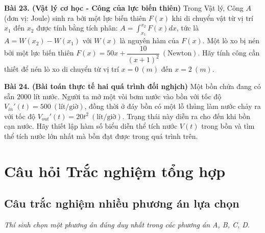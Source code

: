 \documentclass[12pt]{article}
\begin{document}
\begin{btdo}[]
		\textbf{Bài 23. (Vật lý cơ học - Công của lực biến thiên)} Trong Vật lý, Công $A$ (đơn vị: Joule) sinh ra bởi một lực biến thiên $F(x)$ khi di chuyển vật từ vị trí $x_1$ đến $x_2$ được tính bằng tích phân: $A = \int_{x_1}^{x_2} F(x)dx$, tức là $A = W(x_2) - W(x_1)$ với $W(x)$ là nguyên hàm của $F(x)$. Một lò xo bị nén bởi một lực biến thiên $F(x) = 50x + \dfrac{10}{(x+1)^2} \ (\text{Newton})$. Hãy tính công cần thiết để nén lò xo di chuyển từ vị trí $x = 0 \ (m)$ đến $x = 2 \ (m)$.
		
		\textbf{Bài 24. (Bài toán thực tế hai quá trình đối nghịch)} Một bồn chứa đang có sẵn $2000$ lít nước. Người ta mở một vòi bơm nước vào bồn với tốc độ $V_{in}'(t) = 500 \ (\text{lít/giờ})$, đồng thời ở đáy bồn có một lỗ thủng làm nước chảy ra với tốc độ $V_{out}'(t) = 20t^2 \ (\text{lít/giờ})$. Trạng thái này diễn ra cho đến khi bồn cạn nước. Hãy thiết lập hàm số biểu diễn thể tích nước $V(t)$ trong bồn và tìm thể tích nước lớn nhất mà bồn đạt được trong quá trình trên.
	\end{btdo}
	
	\newpage
	
	\section{Câu hỏi Trắc nghiệm tổng hợp}
	
	\subsection{Câu trắc nghiệm nhiều phương án lựa chọn}
	\textit{Thí sinh chọn một phương án đúng duy nhất trong các phương án A, B, C, D.}
	
\end{document}
